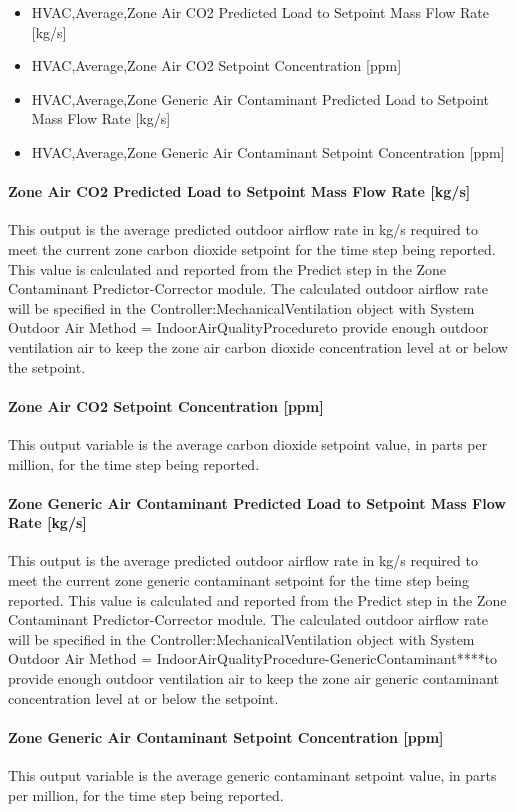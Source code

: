 \begin{itemize}
\item
  HVAC,Average,Zone Air CO2 Predicted Load to Setpoint Mass Flow Rate {[}kg/s{]}
\item
  HVAC,Average,Zone Air CO2 Setpoint Concentration {[}ppm{]}
\item
  HVAC,Average,Zone Generic Air Contaminant Predicted Load to Setpoint Mass Flow Rate {[}kg/s{]}
\item
  HVAC,Average,Zone Generic Air Contaminant Setpoint Concentration {[}ppm{]}
\end{itemize}

\paragraph{Zone Air CO2 Predicted Load to Setpoint Mass Flow Rate {[}kg/s{]}}\label{zone-air-co2-predicted-load-to-setpoint-mass-flow-rate-kgs}

This output is the average predicted outdoor airflow rate in kg/s required to meet the current zone carbon dioxide setpoint for the time step being reported. This value is calculated and reported from the Predict step in the Zone Contaminant Predictor-Corrector module. The calculated outdoor airflow rate will be specified in the Controller:MechanicalVentilation object with System Outdoor Air Method = IndoorAirQualityProcedureto provide enough outdoor ventilation air to keep the zone air carbon dioxide concentration level at or below the setpoint.

\paragraph{Zone Air CO2 Setpoint Concentration {[}ppm{]}}\label{zone-air-co2-setpoint-concentration-ppm}

This output variable is the average carbon dioxide setpoint value, in parts per million, for the time step being reported.

\paragraph{Zone Generic Air Contaminant Predicted Load to Setpoint Mass Flow Rate {[}kg/s{]}}\label{zone-generic-air-contaminant-predicted-load-to-setpoint-mass-flow-rate-kgs}

This output is the average predicted outdoor airflow rate in kg/s required to meet the current zone generic contaminant setpoint for the time step being reported. This value is calculated and reported from the Predict step in the Zone Contaminant Predictor-Corrector module. The calculated outdoor airflow rate will be specified in the Controller:MechanicalVentilation object with System Outdoor Air Method = IndoorAirQualityProcedure-GenericContaminant****to provide enough outdoor ventilation air to keep the zone air generic contaminant concentration level at or below the setpoint.

\paragraph{Zone Generic Air Contaminant Setpoint Concentration {[}ppm{]}}\label{zone-generic-air-contaminant-setpoint-concentration-ppm}

This output variable is the average generic contaminant setpoint value, in parts per million, for the time step being reported.
